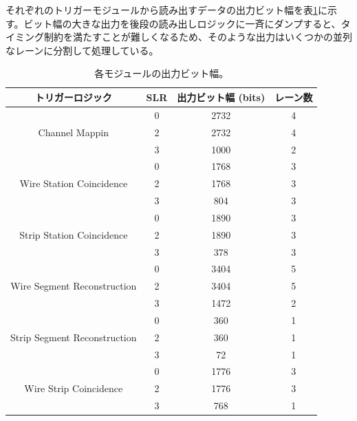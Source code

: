 それぞれのトリガーモジュールから読み出すデータの出力ビット幅を表\ref{tab:output_width}に示す。ビット幅の大きな出力を後段の読み出しロジックに一斉にダンプすると、タイミング制約を満たすことが難しくなるため、そのような出力はいくつかの並列なレーンに分割して処理している。

\begin{table}[]
    \centering
    \caption[各モジュールの出力ビット幅]{各モジュールの出力ビット幅。}
    \label{tab:output_width}    
    \begin{tabular}{|c|c|c|c|}
    \hline
    トリガーロジック                                      & SLR & 出力ビット幅 (bits) & レーン数 \\ \hline\hline
    \multirow{3}{*}{Channel Mappin}               & 0   & 2732          & 4    \\ \cline{2-4} 
                                                  & 2   & 2732          & 4    \\ \cline{2-4} 
                                                  & 3   & 1000          & 2    \\ \hline
    \multirow{3}{*}{Wire Station Coincidence}     & 0   & 1768          & 3    \\ \cline{2-4} 
                                                  & 2   & 1768          & 3    \\ \cline{2-4} 
                                                  & 3   & 804           & 3    \\ \hline
    \multirow{3}{*}{Strip Station Coincidence}    & 0   & 1890          & 3    \\ \cline{2-4} 
                                                  & 2   & 1890          & 3    \\ \cline{2-4} 
                                                  & 3   & 378           & 3    \\ \hline
    \multirow{3}{*}{Wire Segment Reconstruction}  & 0   & 3404          & 5    \\ \cline{2-4} 
                                                  & 2   & 3404          & 5    \\ \cline{2-4} 
                                                  & 3   & 1472          & 2    \\ \hline
    \multirow{3}{*}{Strip Segment Reconstruction} & 0   & 360           & 1    \\ \cline{2-4} 
                                                  & 2   & 360           & 1    \\ \cline{2-4} 
                                                  & 3   & 72            & 1    \\ \hline
    \multirow{3}{*}{Wire Strip Coincidence}       & 0   & 1776          & 3    \\ \cline{2-4} 
                                                  & 2   & 1776          & 3    \\ \cline{2-4} 
                                                  & 3   & 768           & 1    \\ \hline
    \end{tabular}
\end{table}

